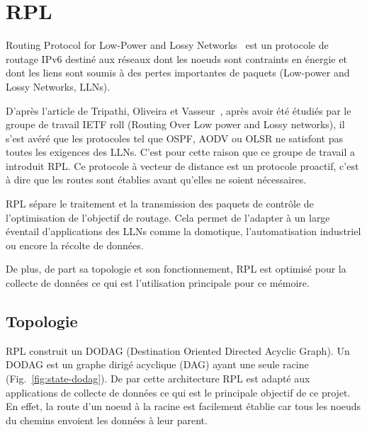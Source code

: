 \newpage
\section{RPL}\label{sec:state-rpl}
\renewcommand{\rightmark}{RPL}

Routing Protocol for Low-Power and Lossy Networks~\cite{rfc:rpl} est un protocole de routage IPv6 destiné aux réseaux dont les noeuds sont contraints en énergie et dont les liens sont soumis à des pertes importantes de paquets (Low-power and Lossy Networks, LLNs).

D'après l'article de Tripathi, Oliveira et Vasseur~\cite{paper:rpl-study}, après avoir été étudiés par le groupe de travail IETF roll (Routing Over Low power and Lossy networks), il s'est avéré que les protocoles tel que OSPF, AODV ou OLSR ne satisfont pas toutes les exigences des LLNs. C'est pour cette raison que ce groupe de travail a introduit RPL.
Ce protocole à vecteur de distance est un protocole proactif, c'est à dire que les routes sont établies avant qu'elles ne soient nécessaires.



RPL sépare le traitement et la transmission des paquets de contrôle de l'optimisation de l'objectif de routage. Cela permet de l'adapter à un large éventail d'applications des LLNs comme la domotique, l'automatisation industriel ou encore la récolte de données.

De plus, de part sa topologie et son fonctionnement, RPL est optimisé pour la collecte de données ce qui est l'utilisation principale pour ce mémoire.


\subsection*{Topologie}
    RPL construit un DODAG (Destination Oriented Directed Acyclic Graph). Un DODAG est un graphe   dirigé acyclique (DAG) ayant une seule racine (Fig.~\ref{fig:state-dodag}). De par cette architecture RPL est adapté aux applications de collecte de données ce qui est le principale objectif de ce projet. En effet, la route d'un noeud à la racine est facilement établie car tous les noeuds du chemins envoient les données à leur parent.

